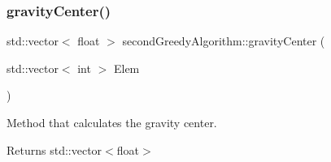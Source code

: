 \subsubsection{\texorpdfstring{gravity\+Center()}{gravityCenter()}}
{\footnotesize\ttfamily std\+::vector$<$ float $>$ second\+Greedy\+Algorithm\+::gravity\+Center (\begin{DoxyParamCaption}\item[{std\+::vector$<$ int $>$}]{Elem }\end{DoxyParamCaption})}



Method that calculates the gravity center. 

\begin{DoxyReturn}{Returns}
std\+::vector$<$float$>$ 
\end{DoxyReturn}

